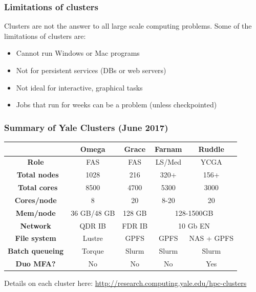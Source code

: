\documentclass[10pt]{beamer}
\begin{document}
\begin{frame}
\frametitle{Limitations of clusters}
Clusters are not the answer to all large scale computing problems.
Some of the limitations of clusters are:

\begin{itemize}
\item Cannot run Windows or Mac programs
\item Not for persistent services (DBs or web servers)
\item Not ideal for interactive, graphical tasks
\item Jobs that run for weeks can be a problem (unless checkpointed)
\end{itemize}
\end{frame}

\begin{frame}[fragile]
\frametitle{Summary of Yale Clusters (June 2017)}
\begin{tabular}{|c|c|c|c|c|}
\hline
& \textbf{Omega} & \textbf{Grace}& \textbf{Farnam} & \textbf{Ruddle} \\
\hline
\textbf{Role} & FAS & FAS & LS/Med & YCGA  \\
\hline
\textbf{~Total nodes} & 1028 & 216 & 320+ & 156+  \\
\hline
\textbf{~Total cores} & 8500 & 4700 & 5300 & 3000 \\
\hline
\textbf{Cores/node} & 8 & 20 & 8-20 & 20 \\
\hline
\textbf{Mem/node} & 36 GB/48 GB & 128 GB & \multicolumn{2}{c}{128-1500GB}  \\
\hline
\textbf{Network} & QDR IB & FDR IB& \multicolumn{2}{c}{10 Gb EN}  \\
\hline
\textbf{File system} & Lustre & GPFS & GPFS & NAS + GPFS \\
\hline
\textbf{Batch queueing} & Torque & Slurm & Slurm & Slurm \\
\hline
\textbf{Duo MFA?} & No & No & No & Yes \\
\hline
\end{tabular}

\vskip10pt

Details on each cluster here:
\url{http://research.computing.yale.edu/hpc-clusters}

\end{frame}
\end{document}
